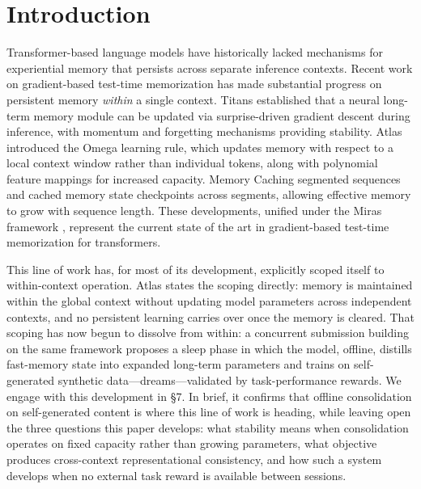 \documentclass[11pt]{article}
\begin{document}
\section{Introduction}

Transformer-based language models have historically lacked mechanisms for experiential memory that persists across separate inference contexts. Recent work on gradient-based test-time memorization has made substantial progress on persistent memory \emph{within} a single context. Titans \cite{behrouz2024titans} established that a neural long-term memory module can be updated via surprise-driven gradient descent during inference, with momentum and forgetting mechanisms providing stability. Atlas \cite{behrouz2025atlas} introduced the Omega learning rule, which updates memory with respect to a local context window rather than individual tokens, along with polynomial feature mappings for increased capacity. Memory Caching \cite{behrouz2026memcache} segmented sequences and cached memory state checkpoints across segments, allowing effective memory to grow with sequence length. These developments, unified under the Miras framework \cite{behrouz2025miras}, represent the current state of the art in gradient-based test-time memorization for transformers.

This line of work has, for most of its development, explicitly scoped itself to within-context operation. Atlas states the scoping directly: memory is maintained within the global context without updating model parameters across independent contexts, and no persistent learning carries over once the memory is cleared. That scoping has now begun to dissolve from within: a concurrent submission building on the same framework \cite{anonymous2026sleep} proposes a sleep phase in which the model, offline, distills fast-memory state into expanded long-term parameters and trains on self-generated synthetic data---dreams---validated by task-performance rewards. We engage with this development in \S 7. In brief, it confirms that offline consolidation on self-generated content is where this line of work is heading, while leaving open the three questions this paper develops: what stability means when consolidation operates on fixed capacity rather than growing parameters, what objective produces cross-context representational consistency, and how such a system develops when no external task reward is available between sessions.
\end{document}
